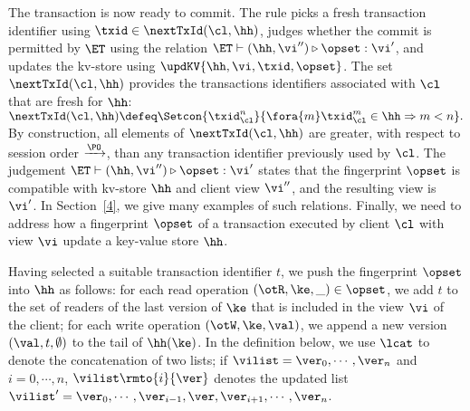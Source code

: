 The transaction is now ready to commit. The rule picks a fresh
transaction identifier using $\txid \in \nextTxId(\cl, \hh)$, judges
whether the commit is permitted by $\ET$ using the relation
$\ET \vdash (\hh, \vi'') \triangleright \opset : \vi'$, and updates
the kv-store using $\updKV{\hh, \vi, \txid, \opset}$.  The
set $\nextTxId(\cl, \hh)$ provides the  transactions identifiers
associated with $\cl$ that are fresh for  $\hh$:
$
\nextTxId(\cl, \hh) \defeq \Setcon{\txid_{\cl}^{n}}{\fora{m}
  \txid_{\cl}^{m} \in \hh \Rightarrow m < n }.
$
 By construction, all
elements of $\nextTxId(\cl, \hh)$ are greater, with respect to session
order $\xrightarrow{\PO}$,  than any transaction identifier previously
used by $\cl$. The judgement $\ET \vdash (\hh, \vi'') \triangleright
\opset : \vi'$
states that the fingerprint $\opset$ is compatible with kv-store $\hh$
and client view $\vi''$, and the resulting view  is $\vi'$. In
Section~\ref{4}, 
we give many examples of such relations.
Finally, we need to address how a fingerprint  $\opset$ of a
transaction executed
by client $\cl$  with view $\vi$  update a  key-value store $\hh$. 




Having selected a suitable transaction identifier $t$, we push the
fingerprint $\opset$ 
into $\hh$ as follows: for each read operation $(\otR, \ke, \_) \in \opset$, we add $t$ 
to the set of readers of the last version of $\ke$ that is included in the view $\vi$ of the client; 
for each write operation $(\otW, \ke, \val)$, we append a new version $(\val, t, \emptyset)$ 
to the tail of $\hh(\ke)$.
In the definition below, we use $\lcat$ to denote the concatenation of two lists; 
if $\vilist = \ver_0, \cdots, \ver_n$ and $i=0,\cdots,n$, 
$\vilist\rmto{i}{\ver}$ denotes the updated list 
$\vilist' = \ver_0, \cdots, \ver_{i-1}, \ver, \ver_{i+1}, \cdots,
\ver_{n}$. 

